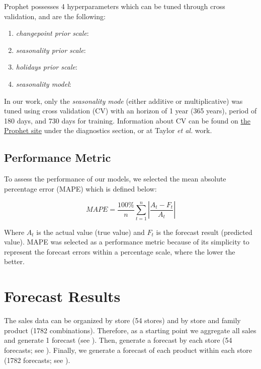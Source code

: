 Prophet possesses 4 hyperparameters which can be tuned through cross validation, and are the following:

\begin{enumerate}
\item \textit{changepoint prior scale}:
\item \textit{seasonality prior scale}:
\item \textit{holidays prior scale}:
\item \textit{seasonality model}:   
\end{enumerate}

In our work, only the \textit{seasonality mode}  (either additive or multiplicative)  was tuned using cross validation (CV) with an horizon of 1 year (365 years), period of 180 days, and 730 days for training. Information about CV can be found on \href{https://facebook.github.io/prophet/docs/installation.html}{the Prophet site} under the diagnostics section, or at Taylor \textit{et al.} work. 

\subsection[Performance Metric]{Performance Metric}
\label{sec:error}

To assess the performance of our models, we selected the mean absolute percentage error (MAPE) which is defined below:

\[ MAPE= \frac{100\%}{n} \sum_{t=1}^n \left| \frac{A_t - F_t}{A_t} \right|  \]

Where $A_t$ is the actual value (true value) and $F_t$ is the forecast result (predicted value). MAPE was selected as a performance metric because of its simplicity to represent the forecast errors within a percentage scale, where the lower the better. 

\clearpage

\section[Forecast Results]{Forecast Results}
\label{sec:results}

The sales data can be organized by store (54 stores) and by store and family product (1782 combinations). Therefore, as a starting point we aggregate all sales and generate 1 forecast (see ). Then, generate a forecast by each store (54 forecasts; see ). Finally, we generate a forecast of each product within each store (1782 forecasts; see ).

